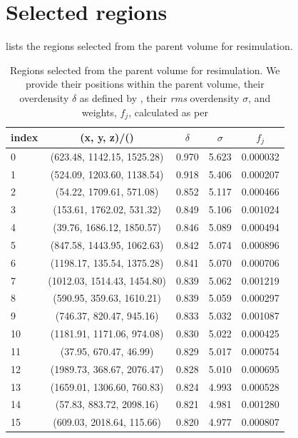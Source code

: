 \section{Selected regions}
\label{sec:regions}

 lists the regions selected from the parent volume for resimulation.

\begin{table}
	\centering
	\caption{Regions selected from the parent volume for resimulation.
	We provide their positions within the parent volume, their overdensity $\delta$ as defined by , their \textit{rms} overdensity $\sigma$, and weights, $f_j$, calculated as per 
	}
	\label{tab:regions}
	\begin{tabular}{lcccc} %
		\hline
		index & (x, y, z)/(\cMpch) & $\delta$ & $\sigma$ & $f_j$\\
		\hline
		0 &   (623.48, 1142.15, 1525.28)  &  0.970 &  5.623 &  0.000032 \\
		1 &   (524.09, 1203.60, 1138.54)  &  0.918 &  5.406 &  0.000207 \\
		2 &   (54.22, 1709.61, 571.08)    &  0.852 &  5.117 &  0.000466 \\
		3 &   (153.61, 1762.02, 531.32)   &  0.849 &  5.106 &  0.001024 \\
		4 &   (39.76, 1686.12, 1850.57)   &  0.846 &  5.089 &  0.000494 \\
		5 &   (847.58, 1443.95, 1062.63)  &  0.842 &  5.074 &  0.000896 \\
		6 &   (1198.17, 135.54, 1375.28)  &  0.841 &  5.070 &  0.000706 \\
		7 &   (1012.03, 1514.43, 1454.80) &  0.839 &  5.062 &  0.001219 \\
		8 &   (590.95, 359.63, 1610.21)   &  0.839 &  5.059 &  0.000297 \\
		9 &   (746.37, 820.47, 945.16)    &  0.833 &  5.032 &  0.001087 \\
		10 &  (1181.91, 1171.06, 974.08)  &  0.830 &  5.022 &  0.000425 \\
		11 &  (37.95, 670.47, 46.99)      &  0.829 &  5.017 &  0.000754 \\
		12 &  (1989.73, 368.67, 2076.47)  &  0.828 &  5.010 &  0.000695 \\
		13 &  (1659.01, 1306.60, 760.83)  &  0.824 &  4.993 &  0.000528 \\
		14 &  (57.83, 883.72, 2098.16)    &  0.821 &  4.981 &  0.001280 \\
		15 &  (609.03, 2018.64, 115.66)   &  0.820 &  4.977 &  0.000807 \\

\end{tabular}
\end{table}
